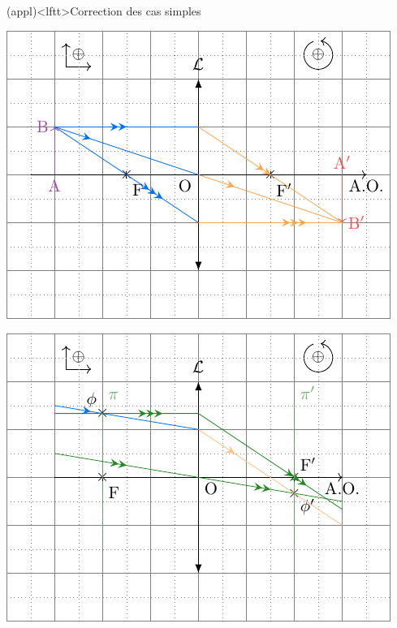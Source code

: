 \documentclass[../../main/main.tex]{subfiles}
\begin{document}
\begin{tcn}[label=exem, sidebyside](appl)<lftt>{Correction des cas simples}
	\begin{center}
		\includegraphics[width=\linewidth]{lent_conv-constru_simple}
		\label{fig:corrconvconstrusimple}
	\end{center}
	\tcblower
	\begin{center}
		\includegraphics[width=\linewidth]{lent_conv-qqe}
		\label{fig:convconstruqqe}
	\end{center}
\end{tcn}
\end{document}
